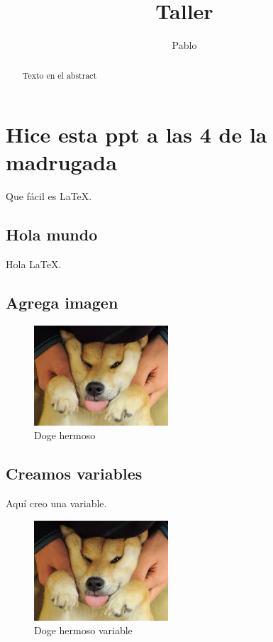 \documentclass[]{article}
\title{Taller}
\author{Pablo}
\begin{document}
\maketitle

\begin{abstract}
	
	Texto en el abstract

\end{abstract}

\section{Hice esta ppt a las 4 de la madrugada}

Que fácil es \LaTeX.

\subsection{Hola mundo}

Hola \LaTeX.

\subsection{Agrega imagen}

\begin{figure}[H]
	\centering
	\includegraphics[width=5cm]{doge.jpg}
	\caption{Doge hermoso}
	\label{doge}
\end{figure}

\subsection{Creamos variables}

Aquí creo una variable.
\def\dogesize {5cm}

\begin{figure}[H]
	\centering
	\includegraphics[width=\dogesize]{doge.jpg}
	\caption{Doge hermoso variable}
\end{figure}
\end{document}
